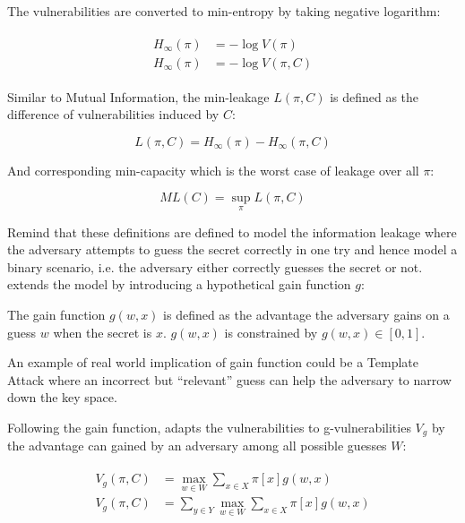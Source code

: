 \begin{definition}
	The vulnerabilities are converted to min-entropy by taking negative logarithm:
	
	\begin{eqnarray}
		\begin{aligned}
			H_{\infty}(\pi) &= -\log{V(\pi)} \\
			H_{\infty}(\pi) &= -\log{V(\pi,C)}
		\end{aligned}
	\end{eqnarray}
	
	Similar to Mutual Information, the min-leakage $L(\pi,C)$ is defined as the difference of vulnerabilities induced by $C$:
	
	\begin{equation}
		L(\pi, C) = H_{\infty}(\pi) - H_{\infty}(\pi, C)
	\end{equation}
	
	And corresponding min-capacity which is the worst case of leakage over all $\pi$:
	
	\begin{equation}
		ML(C) = \sup_{\pi}{L(\pi,C)}
	\end{equation}
\end{definition}

Remind that these definitions are defined to model the information leakage where the adversary attempts to guess the secret correctly in one try and hence model a binary scenario, i.e. the adversary either correctly guesses the secret or not. \cite{GLeakage} extends the model by introducing a hypothetical gain function $g$:

\begin{definition}
	The gain function $g(w,x)$ is defined as the advantage the adversary gains on a guess $w$ when the secret is $x$. $g(w,x)$ is constrained by $g(w,x) \in [0,1]$.
\end{definition}

An example of real world implication of gain function could be a Template Attack\cite{TemplateAttack} \cite{PracticalTemplate} where an incorrect but ``relevant'' guess can help the adversary to narrow down the key space.

Following the gain function, \cite{GLeakage} adapts the vulnerabilities to g-vulnerabilities $V_g$ by the advantage can gained by an adversary among all possible guesses $W$:

\begin{eqnarray}
	\begin{aligned}
		V_{g}(\pi, C) &= \max_{w \in W}\sum_{x \in X}{\pi[x]g(w,x)} \\
		V_{g}(\pi, C) &= \sum_{y \in Y}{\max_{w \in W}\sum_{x \in X}{\pi[x]g(w,x)}}
	\end{aligned}
\end{eqnarray}

